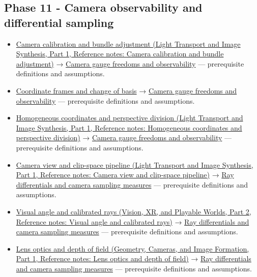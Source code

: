 \subsection{Phase 11 - Camera observability and differential sampling}\label{appendix-4ad47bdd269a-phase-11---camera-observability-and-differential-sampling}

\hypertarget{appendix-4ad47bdd269a-phase-11---camera-observability-and-differential-sampling}{}

\begin{itemize}
\tightlist
\item
  \href{../04-Light-Transport-and-Image-Synthesis-P01/main.pdf\#nameddest=appendix-3ee9861904d5}{Camera calibration and bundle adjustment (Light Transport and Image Synthesis, Part 1, Reference notes: Camera calibration and bundle adjustment)} → \hyperref[appendix-113f0267e5f4]{Camera gauge freedoms and observability} --- prerequisite definitions and assumptions.
\item
  \hyperref[appendix-1bae9457dbc3]{Coordinate frames and change of basis} → \hyperref[appendix-113f0267e5f4]{Camera gauge freedoms and observability} --- prerequisite definitions and assumptions.
\item
  \href{../04-Light-Transport-and-Image-Synthesis-P01/main.pdf\#nameddest=appendix-cb3b26862282}{Homogeneous coordinates and perspective division (Light Transport and Image Synthesis, Part 1, Reference notes: Homogeneous coordinates and perspective division)} → \hyperref[appendix-113f0267e5f4]{Camera gauge freedoms and observability} --- prerequisite definitions and assumptions.
\item
  \href{../04-Light-Transport-and-Image-Synthesis-P01/main.pdf\#nameddest=appendix-1c07d64f5e70}{Camera view and clip-space pipeline (Light Transport and Image Synthesis, Part 1, Reference notes: Camera view and clip-space pipeline)} → \hyperref[appendix-8c40fad29462]{Ray differentials and camera sampling measures} --- prerequisite definitions and assumptions.
\item
  \href{../07-Vision-XR-and-Playable-Worlds-P02/main.pdf\#nameddest=appendix-7d356c396d1a}{Visual angle and calibrated rays (Vision, XR, and Playable Worlds, Part 2, Reference notes: Visual angle and calibrated rays)} → \hyperref[appendix-8c40fad29462]{Ray differentials and camera sampling measures} --- prerequisite definitions and assumptions.
\item
  \href{../03-Geometry-Cameras-and-Image-Formation-P01/main.pdf\#nameddest=appendix-21f8456e2629}{Lens optics and depth of field (Geometry, Cameras, and Image Formation, Part 1, Reference notes: Lens optics and depth of field)} → \hyperref[appendix-8c40fad29462]{Ray differentials and camera sampling measures} --- prerequisite definitions and assumptions.
\end{itemize}
